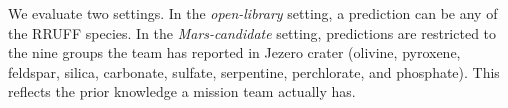 We evaluate two settings. In the \emph{open-library} setting, a prediction can be any of the \nSpecies{} RRUFF species. In the \emph{Mars-candidate} setting, predictions are restricted to the nine groups the team has reported in Jezero crater (olivine, pyroxene, feldspar, silica, carbonate, sulfate, serpentine, perchlorate, and phosphate). This reflects the prior knowledge a mission team actually has.
